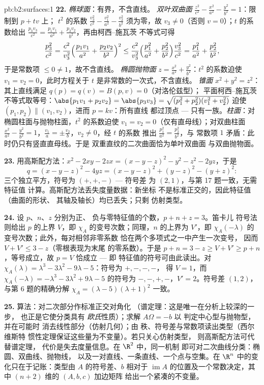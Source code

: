 \begin{solution}{pb:b2:surfaces:1}
\textbf{22.} \emph{椭球面}：有界，不含直线。
\emph{双叶双曲面} $\frac{z^2}{c^2} -
\frac{x^2}{a^2} - \frac{y^2}{b^2} = 1$：限制到 $p + tv$ 上；
$t^2$ 的系数 $\frac{v_3^2}{c^2} - \frac{v_1^2}{a^2}
- \frac{v_2^2}{b^2}$ 须为零，故 $v_3 \neq 0$（否则 $v =
0$）；$t$ 的系数给出 $\frac{p_3v_3}{c^2} =
\frac{p_1v_1}{a^2} + \frac{p_2v_2}{b^2}$，再由柯西–施瓦茨
不等式可得
\[
\frac{p_3^2}{c^2}
= \frac{c^2}{v_3^2}\Bigl(\frac{p_1v_1}{a^2} +
\frac{p_2v_2}{b^2}\Bigr)^2
\leq \frac{c^2}{v_3^2}\Bigl(\frac{p_1^2}{a^2} +
\frac{p_2^2}{b^2}\Bigr)\frac{v_3^2}{c^2}
= \frac{p_1^2}{a^2} + \frac{p_2^2}{b^2},
\]
于是常数项 $\leq 0 \neq 1$，故不含直线。
\emph{椭圆抛物面} $z = \frac{x^2}{a^2} +
\frac{y^2}{b^2}$：$t^2$ 的系数迫使 $v_1 = v_2 =
0$，此时方程关于 $t$ 是非常数的一次式，不含直线。
\emph{锥面} $x^2 + y^2 = z^2$：其上直线满足 $q(p) =
q(v) = B(p, v) = 0$（对洛伦兹型）；
平面柯西–施瓦茨不等式取等号：$\abs{p_1v_1 + p_2v_2} = \abs{p_3v_3} =
\sqrt{(p_1^2 + p_2^2)(v_1^2 + v_2^2)}$ 迫使 $(p_1, p_2)
\parallel (v_1, v_2)$，进而 $p = kv$：所有直线
都过顶点 --- 只有一族。\emph{柱面}：对
椭圆柱面与抛物柱面，$t^2$ 的系数迫使
$v_1 = v_2 = 0$（仅有直母线）；对双曲柱面
$\frac{x^2}{a^2} - \frac{y^2}{b^2} = 1$，$\frac{v_1}a = \pm
\frac{v_2}b$，$v_2 \neq 0$，经 $t$ 的系数
推出 $\frac{p_1^2}{a^2} = \frac{p_2^2}{b^2}$，与
常数项 $1$ 矛盾：此时仍只有竖直直母线。于是
双重直纹的二次曲面恰为单叶双曲面
与双曲抛物面。

\textbf{23.} 用高斯配方法：$x^2 - 2xy - 2zx = (x - y - z)^2 - y^2 -
z^2 - 2yz$，于是
\[
q = (x - y - z)^2 - 4yz = (x - y - z)^2 + (y - z)^2 - (y +
z)^2 :
\]
三个独立平方，符号为 $(+, +, -)$ --- 符号差
为 $(2, 1)$，与第 17 题一致，无需特征值
计算。高斯配方法丢失度量数据：新坐标
不是标准正交的，因此特征值（曲面的形状、
其轴及轴长）均已丢失；只剩
仿射类型。

\textbf{24.} 设 $p$、$n$、$z$ 分别为正、
负与零特征值的个数，$p + n + z = 3$。笛卡儿
符号法则给出 $p$ 的上界 $V$，即
$\chi_A$ 的变号次数；同理，$n$ 的上界为 $V'$，即
$\chi_A(-\lambda)$ 的变号次数；此外，每对相邻非零系数
恰在两个多项式之一中产生一次变号，
因而 $V + V' \leq 3 - z$（零根表现为末尾
的零系数）。于是 $p + n = 3 - z \geq
V + V' \geq p + n$，等号成立，故 $p = V$ 恰成立 --- 即
特征值的符号可由此读出。对 $\chi_A(\lambda)
= \lambda^3 - 3\lambda^2 - 9\lambda - 5$：符号为 $+,-,-,-$，
得 $V = 1$，而 $\chi_A(-\lambda) = -\lambda^3 - 3\lambda^2
+ 9\lambda - 5$ 的符号为 $-,-,+,-$，$V' = 2$。符号差 $(1,
2)$，与第 6 题的精确分解 $\chi_A =
(\lambda - 5)(\lambda + 1)^2$ 一致。

\textbf{25.} 算法：对二次部分作标准正交对角化
（谱定理：这是唯一在分析上较深的一步，
也正是它使分类具有
\emph{欧氏}性质）；求解 $A\Omega = -b$ 以
判定中心型与抛物型，并在可能时
消去线性部分（仿射几何）；由
秩、符号差与常数项读出类型（西尔维斯特
惯性定理保证这些量为不变量）。若只关心仿射类型，
则高斯配方法可代替谱定理，
代价是失去度量信息。在 $\R^2$ 中，同一机制
即可对二次曲线分类：椭圆、双曲线、抛物线，
以及一对直线、一条直线、一个点与空集。在 $\R^n$
中的变化只在于记账：类型由
$A$ 的符号差、$b$ 相对于
$\operatorname{im}A$ 的位置及一个常数决定，其中
$(n{+}2)$ 维的 $(A, b, c)$ 加边矩阵
给出一个紧凑的不变量。
\end{solution}
